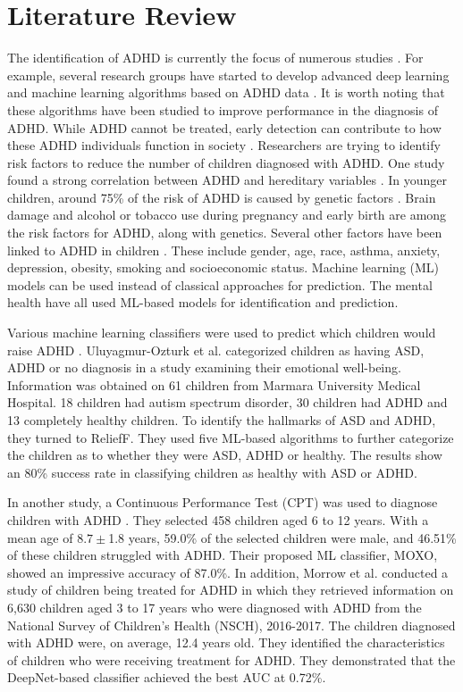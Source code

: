 \section{Literature Review}
\label{lr}
The identification of ADHD is currently the focus of numerous studies \cite{cortese2022half,loh2022automated,galvez2022therapeutic,faraone2021world}. For example, several research groups have started to develop advanced deep learning and machine learning algorithms based on ADHD data \cite{wang2022attention,hernandez2023machine}. It is worth noting that these algorithms have been studied to improve performance in the diagnosis of ADHD. While ADHD cannot be treated, early detection can contribute to how these ADHD individuals function in society \cite{carpentier2012adhd}. Researchers are trying to identify risk factors to reduce the number of children diagnosed with ADHD. One study found a strong correlation between ADHD and hereditary variables \cite{faraone2021world}. In younger children, around 75\% of the risk of ADHD is caused by genetic factors \cite{faraone2021world}. Brain damage and alcohol or tobacco use during pregnancy and early birth are among the risk factors for ADHD, along with genetics. Several other factors have been linked to ADHD in children \cite{claussen2022all}. These include gender, age, race, asthma, anxiety, depression, obesity, smoking and socioeconomic status. Machine learning (ML) models can be used instead of classical approaches for prediction. The mental health \cite{kessler2019role,zea2022machine} have all used ML-based models for identification and prediction.

Various machine learning classifiers were used to predict which children would raise ADHD \cite{kim2021can,zhang2021evidence}. Uluyagmur-Ozturk et al. \cite{uluyagmur2016adhd} categorized children as having ASD, ADHD or no diagnosis in a study examining their emotional well-being. Information was obtained on 61 children from Marmara University Medical Hospital. 18 children had autism spectrum disorder, 30 children had ADHD and 13 completely healthy children. To identify the hallmarks of ASD and ADHD, they turned to ReliefF. They used five ML-based algorithms to further categorize the children as to whether they were ASD, ADHD or healthy. The results show an 80\% success rate in classifying children as healthy with ASD or ADHD.

In another study, a Continuous Performance Test (CPT) was used to diagnose children with ADHD \cite{slobodin2020machine}. They selected 458 children aged 6 to 12 years. With a mean age of $8.7\pm$1.8 years, 59.0\% of the selected children were male, and 46.51\% of these children struggled with ADHD. Their proposed ML classifier, MOXO, showed an impressive accuracy of 87.0\%.
%
In addition, Morrow et al. conducted a study of children being treated for ADHD \cite{morrow2020leveraging} in which they retrieved information on 6,630 children aged 3 to 17 years who were diagnosed with ADHD from the National Survey of Children's Health (NSCH), 2016-2017. The children diagnosed with ADHD were, on average, 12.4 years old. They identified the characteristics of children who were receiving treatment for ADHD. They demonstrated that the DeepNet-based classifier achieved the best AUC at 0.72\%.


